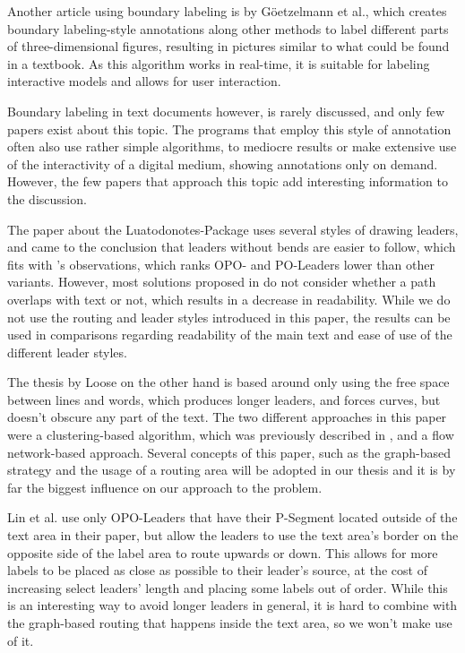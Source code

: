 \documentclass[11pt,a4paper]{vutinfth}
\begin{document}
Another article using boundary labeling is \cite{Goetzelmann2006} by G{\"o}etzelmann et al., which creates boundary labeling-style annotations along other methods to label different parts of three-dimensional figures, resulting in pictures similar to what could be found in a textbook. As this algorithm works in real-time, it is suitable for labeling interactive models and allows for user interaction.


Boundary labeling in text documents however, is rarely discussed, and only few papers exist about this topic. The programs that employ this style of annotation often also use rather simple algorithms, to mediocre results or make extensive use of the interactivity of a digital medium, showing annotations only on demand. However, the few papers that approach this topic add interesting information to the discussion.

The paper about the Luatodonotes-Package\cite{Kindermann2014} uses several styles of drawing leaders, and came to the conclusion that leaders without bends are easier to follow, which fits with \cite{Barth2015}'s observations, which ranks OPO- and PO-Leaders lower than other variants.
However, most solutions proposed in \cite{Kindermann2014} do not consider whether a path overlaps with text or not, which results in a decrease in readability. While we do not use the routing and leader styles introduced in this paper, the results can be used in comparisons regarding readability of the main text and ease of use of the different leader styles.%

The thesis by Loose\cite{Loose2015} on the other hand is based around only using the free space between lines and words, which produces longer leaders, and forces curves, but doesn't obscure any part of the text. The two different approaches in this paper were a clustering-based algorithm, which was previously described in \cite{Nollenburg2010}, and a flow network-based approach. Several concepts of this paper, such as the graph-based strategy and the usage of a routing area will be adopted in our thesis and it is by far the biggest influence on our approach to the problem.  %

Lin et al.\cite{Lin2009} use only OPO-Leaders that have their P-Segment located outside of the text area in their paper, but allow the leaders to use the text area's border on the opposite side of the label area to route upwards or down. This allows for more labels to be placed as close as possible to their leader's source, at the cost of increasing select leaders' length and placing some labels out of order. While this is an interesting way to avoid longer leaders in general, it is hard to combine with the graph-based routing that happens inside the text area, so we won't make use of it.
\end{document}
